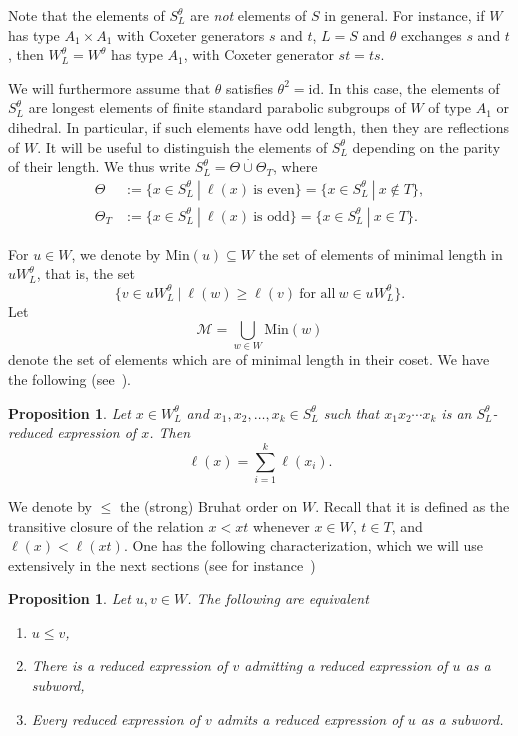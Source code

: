 \documentclass[11pt]{article}
\newtheorem{prop}[theo]{Proposition}
\theoremstyle{definition}
\numberwithin{equation}{section}
\begin{document}
Note that the elements of $S_L^\theta$ are \textit{not} elements of $S$ in general. For instance, if $W$ has type $A_1 \times A_1$ with Coxeter generators $s$ and $t$, $L=S$ and $\theta$ exchanges $s$ and $t$, then $W_L^\theta=W^\theta$ has type $A_1$, with Coxeter generator $st=ts$. 

We will furthermore assume that $\theta$ satisfies $\theta^2=\mathrm{id}$. In this case, the elements of $S_L^\theta$ are longest elements of finite standard parabolic subgroups of $W$ of type $A_1$ or dihedral. In particular, if such elements have odd length, then they are reflections of $W$. It will be useful to distinguish the elements of $S_L^\theta$ depending on the parity of their length. We thus write $S_L^\theta=\Theta\overset{\cdot}{\cup} \Theta_T$, where \begin{align*}\Theta&:=\{ x\in S_L^\theta~|~\ell(x)~\text{is even}\}=\{ x\in S_L^\theta~|~x\notin T\},\\
\Theta_T&:=\{ x\in S_L^\theta~|~\ell(x)~\text{is odd}\}=\{ x\in S_L^\theta~|~x\in T\}.\end{align*}

For $u\in W$, we denote by $\mathrm{Min}(u)\subseteq W$ the set of elements of minimal length in $u W_L^\theta$, that is, the set $$\{ v\in u W_L^\theta~|~\ell(w)\geq \ell(v)~\text{for all}~w\in u W_L^\theta\}.$$
Let $$\mathcal{M}=\bigcup_{w\in W} \mathrm{Min}(w)$$ denote the set of elements which are of minimal length in their coset. We have the following (see~\cite[Proposition 3.5]{muhlh}).
\begin{prop}\label{prop_muhlh}
Let $x\in W_L^\theta$ and $x_1, x_2, \dots, x_k\in S_L^\theta$ such that $x_1 x_2 \cdots x_k$ is an $S_L^\theta$-reduced expression of $x$. Then $$\ell(x)=\sum_{i=1}^k \ell(x_i).$$
\end{prop}


We denote by $\leq$ the (strong) Bruhat order on $W$. Recall that it is defined as the transitive closure of the relation $x < xt$ whenever $x\in W$, $t\in T$, and $\ell(x)<\ell(xt)$. One has the following characterization, which we will use extensively in the next sections (see for instance~\cite[Corollary 2.2.3]{BB})

\begin{prop}
Let $u,v\in W$. The following are equivalent
\begin{enumerate}
	\item $u \leq v$, 
	\item There is a reduced expression of $v$ admitting a reduced expression of $u$ as a subword, 
	\item Every reduced expression of $v$ admits a reduced expression of $u$ as a subword. 
\end{enumerate}
\end{prop}
\end{document}
